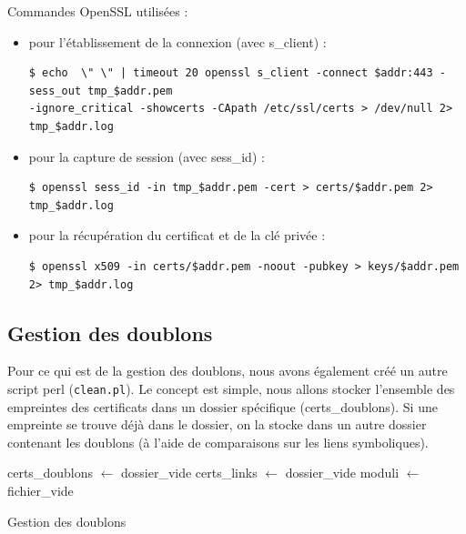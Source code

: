 Commandes OpenSSL utilisées :
\begin{itemize}
\item pour l'établissement de la connexion (avec s\_client) :
\begin{verbatim}
$ echo  \" \" | timeout 20 openssl s_client -connect $addr:443 -sess_out tmp_$addr.pem 
-ignore_critical -showcerts -CApath /etc/ssl/certs > /dev/null 2> tmp_$addr.log
\end{verbatim}

\item  pour la capture de session (avec sess\_id) :
\begin{verbatim}
$ openssl sess_id -in tmp_$addr.pem -cert > certs/$addr.pem 2> tmp_$addr.log
\end{verbatim}

\item pour la récupération du certificat et de la clé privée :
\begin{verbatim}
$ openssl x509 -in certs/$addr.pem -noout -pubkey > keys/$addr.pem 2> tmp_$addr.log
\end{verbatim}
\end{itemize}


\subsection{Gestion des doublons}

Pour ce qui est de la gestion des doublons, nous avons également créé un autre script perl (\texttt{clean.pl}). Le concept est simple, nous allons stocker l'ensemble des empreintes des certificats dans un dossier spécifique (certs\_doublons). Si une empreinte se trouve déjà dans le dossier, on la stocke dans un autre dossier contenant les doublons (à l'aide de comparaisons sur les liens symboliques).\\


\begin{algorithm}[H]
\label{alg:clean}
 certs\_doublons $\leftarrow$ dossier\_vide\;
 certs\_links $\leftarrow$ dossier\_vide\;
 moduli $\leftarrow$ fichier\_vide\;
 \caption{Gestion des doublons} 
\end{algorithm}
\vspace{0.7cm}

